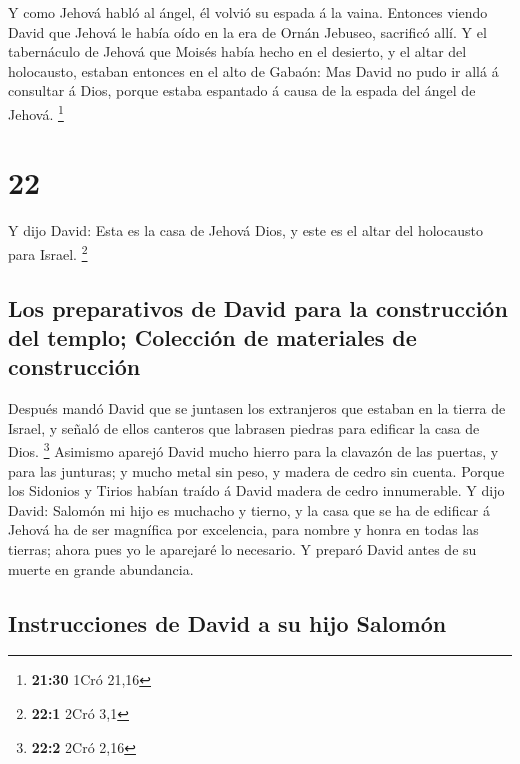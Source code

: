  Y como Jehová habló al ángel, él volvió su espada á la
vaina.  Entonces viendo David que Jehová le había oído en
la era de Ornán Jebuseo, sacrificó allí.  Y el
tabernáculo de Jehová que Moisés había hecho en el desierto, y el altar
del holocausto, estaban entonces en el alto de Gabaón: Mas David no pudo
ir allá á consultar á Dios, porque estaba espantado á causa de la espada
del ángel de Jehová. \footnote{\textbf{21:30} 1Cró 21,16}

\hypertarget{section-21}{%
\section{22}\label{section-21}}

 Y dijo David: Esta es la casa de Jehová Dios, y este es
el altar del holocausto para Israel. \footnote{\textbf{22:1} 2Cró 3,1}

\hypertarget{los-preparativos-de-david-para-la-construcciuxf3n-del-templo-colecciuxf3n-de-materiales-de-construcciuxf3n}{%
\subsection{Los preparativos de David para la construcción del templo;
Colección de materiales de
construcción}\label{los-preparativos-de-david-para-la-construcciuxf3n-del-templo-colecciuxf3n-de-materiales-de-construcciuxf3n}}

 Después mandó David que se juntasen los extranjeros que
estaban en la tierra de Israel, y señaló de ellos canteros que labrasen
piedras para edificar la casa de Dios. \footnote{\textbf{22:2} 2Cró 2,16}
 Asimismo aparejó David mucho hierro para la clavazón de
las puertas, y para las junturas; y mucho metal sin peso, y madera de
cedro sin cuenta.  Porque los Sidonios y Tirios habían
traído á David madera de cedro innumerable.  Y dijo David:
Salomón mi hijo es muchacho y tierno, y la casa que se ha de edificar á
Jehová ha de ser magnífica por excelencia, para nombre y honra en todas
las tierras; ahora pues yo le aparejaré lo necesario. Y preparó David
antes de su muerte en grande abundancia.

\hypertarget{instrucciones-de-david-a-su-hijo-salomuxf3n}{%
\subsection{Instrucciones de David a su hijo
Salomón}\label{instrucciones-de-david-a-su-hijo-salomuxf3n}}

